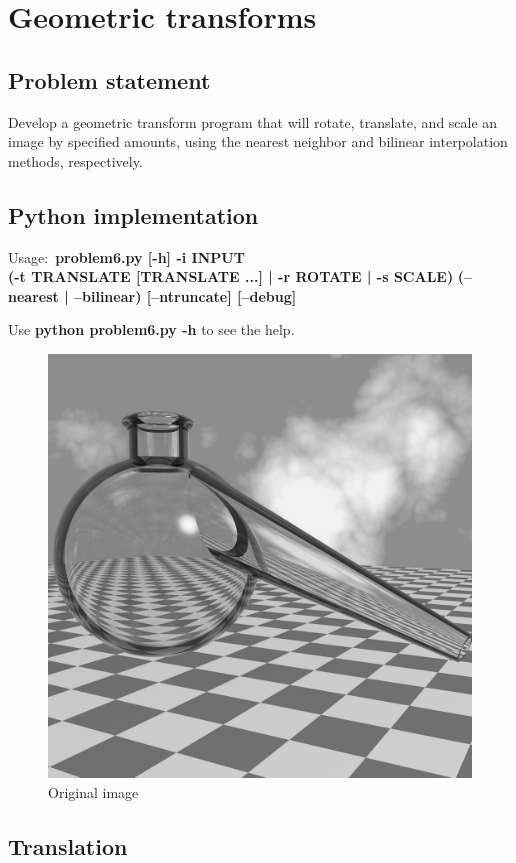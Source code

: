 \chapter{Geometric transforms}

\section{Problem statement}

Develop a geometric transform program that will rotate, translate,
and scale an image by specified amounts, using the nearest neighbor
and bilinear interpolation methods, respectively.

\section{Python implementation}

Usage:~\textbf{problem6.py [-h] -i INPUT} \\
       \textbf{(-t TRANSLATE [TRANSLATE ...] | -r ROTATE | -s SCALE)}
       \textbf{(--nearest | --bilinear) [--ntruncate] [--debug]}

Use \textbf{python problem6.py -h} to see the help.

\pagebreak

\begin{figure}[!htb]\centering
    \includegraphics[width=0.6\linewidth]{./images/6/original.png}
    \caption{\small{Original image}}
\end{figure}


\pagebreak

\section{Translation}

